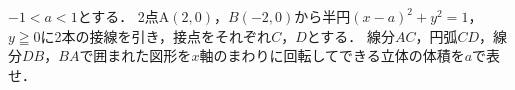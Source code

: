\documentclass[../../main.tex]{subfiles}
\begin{document}
$-1<a<1$とする．
2点A$(2,0)$，$B(-2,0)$から半円$(x-a)^2+y^2=1$，$y \geqq 0$に2本の接線を引き，接点をそれぞれ$C$，$D$とする．
線分$AC$，円弧$CD$，線分$DB$，$BA$で囲まれた図形を$x$軸のまわりに回転してできる立体の体積を$a$で表せ．
\end{document}
